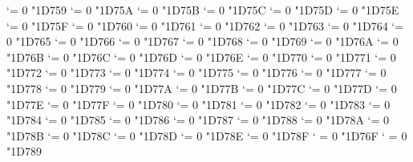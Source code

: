 {  \Umathcode `\Δ = 0 \normalfam "1D759 
  \Umathcode `\Ε = 0 \normalfam "1D75A 
  \Umathcode `\Ζ = 0 \normalfam "1D75B 
  \Umathcode `\Η = 0 \normalfam "1D75C 
  \Umathcode `\Θ = 0 \normalfam "1D75D 
  \Umathcode `\Ι = 0 \normalfam "1D75E 
  \Umathcode `\Κ = 0 \normalfam "1D75F 
  \Umathcode `\Λ = 0 \normalfam "1D760 
  \Umathcode `\Μ = 0 \normalfam "1D761 
  \Umathcode `\Ν = 0 \normalfam "1D762 
  \Umathcode `\Ξ = 0 \normalfam "1D763 
  \Umathcode `\Ο = 0 \normalfam "1D764 
  \Umathcode `\Π = 0 \normalfam "1D765 
  \Umathcode `\Ρ = 0 \normalfam "1D766 
  \Umathcode `\ϴ = 0 \normalfam "1D767 
  \Umathcode `\Σ = 0 \normalfam "1D768 
  \Umathcode `\Τ = 0 \normalfam "1D769 
  \Umathcode `\Υ = 0 \normalfam "1D76A 
  \Umathcode `\Φ = 0 \normalfam "1D76B 
  \Umathcode `\Χ = 0 \normalfam "1D76C 
  \Umathcode `\Ψ = 0 \normalfam "1D76D 
  \Umathcode `\Ω = 0 \normalfam "1D76E 
  \Umathcode `\α = 0 \normalfam "1D770 
  \Umathcode `\β = 0 \normalfam "1D771 
  \Umathcode `\γ = 0 \normalfam "1D772 
  \Umathcode `\δ = 0 \normalfam "1D773 
  \Umathcode `\ε = 0 \normalfam "1D774 
  \Umathcode `\ζ = 0 \normalfam "1D775 
  \Umathcode `\η = 0 \normalfam "1D776 
  \Umathcode `\θ = 0 \normalfam "1D777 
  \Umathcode `\ι = 0 \normalfam "1D778 
  \Umathcode `\κ = 0 \normalfam "1D779 
  \Umathcode `\λ = 0 \normalfam "1D77A 
  \Umathcode `\μ = 0 \normalfam "1D77B 
  \Umathcode `\ν = 0 \normalfam "1D77C 
  \Umathcode `\ξ = 0 \normalfam "1D77D 
  \Umathcode `\ο = 0 \normalfam "1D77E 
  \Umathcode `\π = 0 \normalfam "1D77F 
  \Umathcode `\ρ = 0 \normalfam "1D780 
  \Umathcode `\ς = 0 \normalfam "1D781 
  \Umathcode `\σ = 0 \normalfam "1D782 
  \Umathcode `\τ = 0 \normalfam "1D783 
  \Umathcode `\υ = 0 \normalfam "1D784 
  \Umathcode `\φ = 0 \normalfam "1D785 
  \Umathcode `\χ = 0 \normalfam "1D786 
  \Umathcode `\ψ = 0 \normalfam "1D787 
  \Umathcode `\ω = 0 \normalfam "1D788 
  \Umathcode `\ϵ = 0 \normalfam "1D78A 
  \Umathcode `\ϑ = 0 \normalfam "1D78B 
  \Umathcode `\ϰ = 0 \normalfam "1D78C 
  \Umathcode `\ϕ = 0 \normalfam "1D78D 
  \Umathcode `\ϱ = 0 \normalfam "1D78E 
  \Umathcode `\ϖ = 0 \normalfam "1D78F 
  \Umathcode `\∇ = 0 \normalfam "1D76F 
  \Umathcode `\∂ = 0 \normalfam "1D789 
\tensfbf}%
